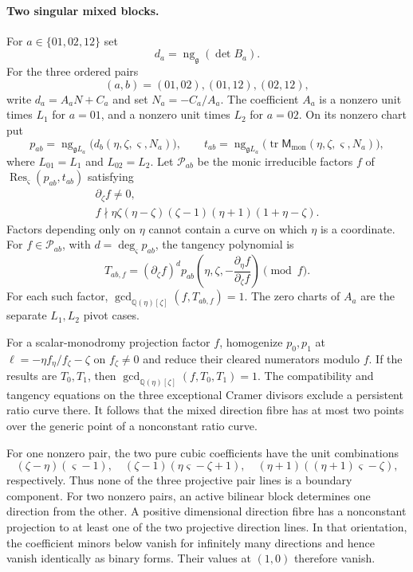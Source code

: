 \documentclass[11pt,a4paper]{article}
\numberwithin{equation}{section}
\theoremstyle{plain}
\theoremstyle{definition}
\theoremstyle{remark}
\begin{document}
\paragraph{Two singular mixed blocks.}
For $a\in\{01,02,12\}$ set
\[
 d_a=\operatorname{ng}_{\mathfrak g}(\det B_a).
\]
For the three ordered pairs
\[
 (a,b)=(01,02),(01,12),(02,12),
\]
write $d_a=A_aN+C_a$ and set $N_a=-C_a/A_a$.
The coefficient $A_a$ is a nonzero unit times $L_1$ for $a=01$,
and a nonzero unit times $L_2$ for $a=02$. On its nonzero chart put
\[
 p_{ab}=\operatorname{ng}_{\mathfrak gL_a}
                 \bigl(d_b(\eta,\zeta,\varsigma,N_a)\bigr),\qquad
 t_{ab}=\operatorname{ng}_{\mathfrak gL_a}
                 \bigl(\operatorname{tr}\mathsf M_{\mathrm{mon}}
                         (\eta,\zeta,\varsigma,N_a)\bigr),
\]
where $L_{01}=L_1$ and $L_{02}=L_2$.
Let $\mathscr P_{ab}$ be the monic irreducible factors $f$ of
$\operatorname{Res}_{\varsigma}(p_{ab},t_{ab})$ satisfying
\[
 \begin{gathered}
 \partial_\zeta f\ne0,\\
 f\nmid \eta\zeta(\eta-\zeta)(\zeta-1)(\eta+1)(1+\eta-\zeta).
 \end{gathered}
\]
Factors depending only on $\eta$ cannot contain a curve on which
$\eta$ is a coordinate.
For $f\in\mathscr P_{ab}$, with
$d=\deg_{\varsigma}p_{ab}$, the tangency polynomial is
\[
 T_{ab,f}=(\partial_\zeta f)^d
       p_{ab}\left(\eta,\zeta,
                      -\frac{\partial_\eta f}{\partial_\zeta f}\right)
       \pmod f.
\]
For each such factor,
$\gcd_{\mathbb Q(\eta)[\zeta]}(f,T_{ab,f})=1$.
The zero charts of $A_a$ are the separate $L_1,L_2$ pivot cases.

For a scalar-monodromy projection factor $f$, homogenize
$p_0,p_1$ at $\ell=-\eta f_\eta/f_\zeta-\zeta$ on $f_\zeta\ne0$
and reduce their cleared numerators modulo $f$.
If the results are $T_0,T_1$, then
$\gcd_{\mathbb Q(\eta)[\zeta]}(f,T_0,T_1)=1$.
The compatibility and tangency equations on the three exceptional
Cramer divisors exclude a persistent ratio curve there.
It follows that the mixed direction fibre has at most two points over
the generic point of a nonconstant ratio curve.

For one nonzero pair, the two pure cubic coefficients have the unit
combinations
\[
 (\zeta -\eta )(\varsigma -1),\quad (\zeta -1)(\eta \varsigma -\zeta +1),\quad
 (\eta +1)((\eta +1)\varsigma -\zeta ),
\]
respectively. Thus none of the three projective pair lines is a boundary
component. For two nonzero pairs, an active bilinear block determines
one direction from the other. A positive dimensional direction fibre
has a nonconstant projection to at least one of the two projective
direction lines. In that orientation, the coefficient minors below
vanish for infinitely many directions and hence vanish identically
as binary forms. Their values at $(1,0)$ therefore vanish.
\end{document}
